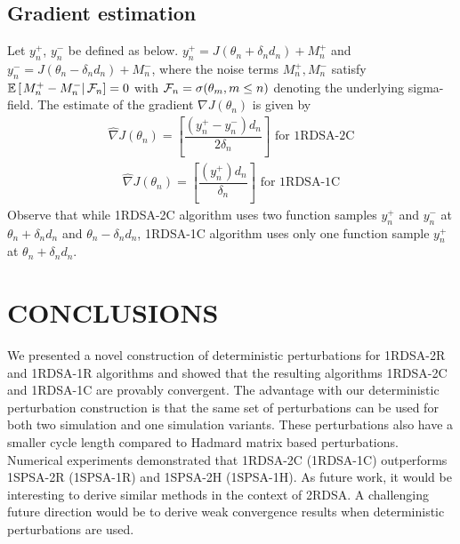 \documentclass[letterpaper, 10 pt, conference]{ieeeconf}  %
\begin{document}
\subsection{Gradient estimation}
Let $y_{n}^{+}$, $y_{n}^{-}$  be defined as below.
$y_{n}^{+} = J(\theta_n+\delta_n d_n) + M_{n}^{+}$ and 
$y_{n}^{-} = J(\theta_n-\delta_n d_n) + M_{n}^{-}$,
where the noise terms $M_{n}^{+}, M_{n}^{-}$ satisfy $\mathbb{E}\left[\left.M_{n}^{+}- 
M_{n}^{-}\right| \mathcal{F}_n\right] = 0$ with $\mathcal{F}_n = \sigma(\theta_m, m\le n)$ 
denoting the underlying sigma-field. 
The estimate of the gradient $\nabla J(\theta_n)$ is given by
\begin{align}
\label{eq:grad-twosided}
\widehat\nabla J(\theta_n)=
\left[\dfrac{(y_{n}^{+} - y_{n}^{-})d_n}{2\delta_n}\right] \text{ for 1RDSA-2C}
\end{align}
\begin{align}
\label{eq:grad-onesided}
\widehat\nabla J(\theta_n)=
\left[\dfrac{(y_{n}^{+})d_n}{\delta_n}\right] \text{ for 1RDSA-1C}
\end{align}
Observe that while 1RDSA-2C algorithm uses two function samples $y_{n}^{+}$ and $y_{n}^{-}$ 
at $\theta_n+\delta_n d_n$ and $\theta_n - \delta_n d_n$, 1RDSA-1C algorithm 
uses only one function sample $y_{n}^{+}$ at $\theta_n+\delta_n d_n$.


\section{CONCLUSIONS}
\label{sec:conclusions}
We presented a novel construction of deterministic perturbations for 
1RDSA-2R and 1RDSA-1R algorithms and showed that the resulting algorithms 
1RDSA-2C and 1RDSA-1C are provably convergent. 
The advantage with our deterministic perturbation construction is that the
same set of perturbations can be used for both two simulation
and one simulation variants. These perturbations also have a smaller cycle length compared to 
Hadmard matrix based perturbations. Numerical experiments demonstrated that 1RDSA-2C (1RDSA-1C) outperforms 
1SPSA-2R (1SPSA-1R) and 1SPSA-2H (1SPSA-1H).
As future work, it would be interesting to derive similar methods in the context of 
2RDSA. A challenging future direction would be to derive weak convergence results when
deterministic perturbations are used.


\end{document}
